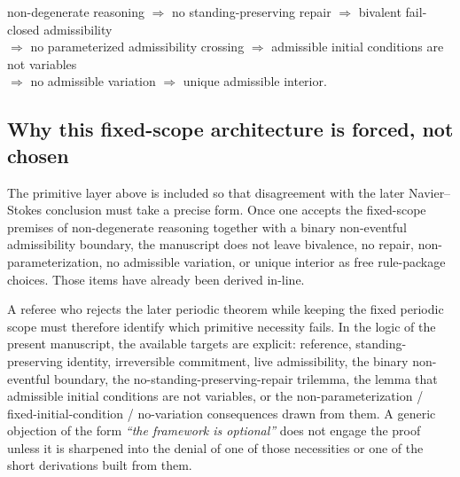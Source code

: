 \begin{tcolorbox}[title={Primitive necessity chain at fixed scope}, colback=blue!2!white, colframe=blue!55!black]
\begin{center}
\small
non-degenerate reasoning $\Longrightarrow$ no standing-preserving repair $\Longrightarrow$ bivalent fail-closed admissibility\\[0.35em]
$\Longrightarrow$ no parameterized admissibility crossing $\Longrightarrow$ admissible initial conditions are not variables\\[0.35em]
$\Longrightarrow$ no admissible variation $\Longrightarrow$ unique admissible interior.
\end{center}
\end{tcolorbox}

\subsection*{Why this fixed-scope architecture is forced, not chosen}
The primitive layer above is included so that disagreement with the later Navier--Stokes conclusion must take a precise form. Once one accepts the fixed-scope premises of non-degenerate reasoning together with a binary non-eventful admissibility boundary, the manuscript does not leave bivalence, no repair, non-parameterization, no admissible variation, or unique interior as free rule-package choices. Those items have already been derived in-line.

\begin{tcolorbox}[title={Forcedness test for the manuscript claim}, colback=blue!2!white, colframe=blue!55!black]
\small
A referee who rejects the later periodic theorem while keeping the fixed periodic scope must therefore identify which primitive necessity fails. In the logic of the present manuscript, the available targets are explicit: reference, standing-preserving identity, irreversible commitment, live admissibility, the binary non-eventful boundary, the no-standing-preserving-repair trilemma, the lemma that admissible initial conditions are not variables, or the non-parameterization / fixed-initial-condition / no-variation consequences drawn from them. A generic objection of the form \emph{``the framework is optional''} does not engage the proof unless it is sharpened into the denial of one of those necessities or one of the short derivations built from them.
\end{tcolorbox}

